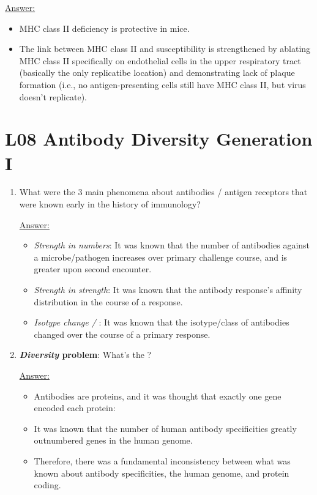 \documentclass{article}
\newenvironment{QandA}{\begin{enumerate}[label=\bfseries Q\arabic*.]}
                       {\end{enumerate}}
\newenvironment{answered}{\par\normalfont\underline{Answer:}}{}
\begin{document}
\begin{QandA}
\begin{answered}
\begin{itemize}
      \item{MHC class II deficiency is protective in mice.}
      \item{The link between MHC class II and susceptibility is strengthened by ablating MHC class II specifically on endothelial cells in the upper respiratory tract (basically the only replicatibe location) and demonstrating lack of plaque formation (i.e., no antigen-presenting cells still have MHC class II, but virus doesn't replicate).}
    \end{itemize}
    \end{answered}
\end{QandA}
\section{L08 Antibody Diversity Generation I}
\begin{QandA}
  \item{What were the 3 main phenomena about antibodies / antigen receptors that were known early in the history of immunology?}
    \begin{answered}
    \begin{itemize}
      \item{\textit{Strength in numbers}: It was known that the number of antibodies against a microbe/pathogen increases over primary challenge course, and is greater upon second encounter.}
      \item{\textit{Strength in strength}: It was known that the antibody response's affinity distribution  in the course of a response.}
      \item{\textit{Isotype change / }: It was known that the isotype/class of antibodies changed over the course of a primary response.}
    \end{itemize}
    \end{answered}
  \item{\textbf{\textit{Diversity} problem}: What's the ?}
    \begin{answered}
    \begin{itemize}
      \item{Antibodies are proteins, and it was thought that exactly one gene encoded each protein: \textit{}}
      \item{It was known that the number of human antibody specificities greatly outnumbered genes in the human genome.}
      \item{Therefore, there was a fundamental inconsistency between what was known about antibody specificities, the human genome, and protein coding.}

\end{itemize}
\end{answered}
\end{QandA}
\end{document}
